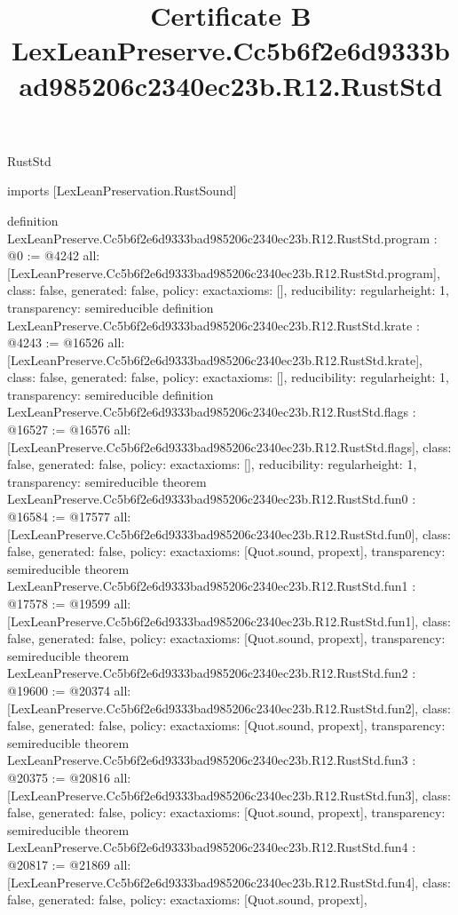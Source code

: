 \begin{lexlean}{RustStd}
\title{Certificate B LexLeanPreserve.Cc5b6f2e6d9333bad985206c2340ec23b.R12.RustStd}
\begin{coremodule}
imports [LexLeanPreservation.RustSound]

definition LexLeanPreserve.Cc5b6f2e6d9333bad985206c2340ec23b.R12.RustStd.program : @0 := @4242 {
  all: [LexLeanPreserve.Cc5b6f2e6d9333bad985206c2340ec23b.R12.RustStd.program],
  class: false,
  generated: false,
  policy: exact{axioms: []},
  reducibility: regular{height: 1},
  transparency: semireducible
}
definition LexLeanPreserve.Cc5b6f2e6d9333bad985206c2340ec23b.R12.RustStd.krate : @4243 := @16526 {
  all: [LexLeanPreserve.Cc5b6f2e6d9333bad985206c2340ec23b.R12.RustStd.krate],
  class: false,
  generated: false,
  policy: exact{axioms: []},
  reducibility: regular{height: 1},
  transparency: semireducible
}
definition LexLeanPreserve.Cc5b6f2e6d9333bad985206c2340ec23b.R12.RustStd.flags : @16527 := @16576 {
  all: [LexLeanPreserve.Cc5b6f2e6d9333bad985206c2340ec23b.R12.RustStd.flags],
  class: false,
  generated: false,
  policy: exact{axioms: []},
  reducibility: regular{height: 1},
  transparency: semireducible
}
theorem LexLeanPreserve.Cc5b6f2e6d9333bad985206c2340ec23b.R12.RustStd.fun0 : @16584 := @17577 {
  all: [LexLeanPreserve.Cc5b6f2e6d9333bad985206c2340ec23b.R12.RustStd.fun0],
  class: false,
  generated: false,
  policy: exact{axioms: [Quot.sound, propext]},
  transparency: semireducible
}
theorem LexLeanPreserve.Cc5b6f2e6d9333bad985206c2340ec23b.R12.RustStd.fun1 : @17578 := @19599 {
  all: [LexLeanPreserve.Cc5b6f2e6d9333bad985206c2340ec23b.R12.RustStd.fun1],
  class: false,
  generated: false,
  policy: exact{axioms: [Quot.sound, propext]},
  transparency: semireducible
}
theorem LexLeanPreserve.Cc5b6f2e6d9333bad985206c2340ec23b.R12.RustStd.fun2 : @19600 := @20374 {
  all: [LexLeanPreserve.Cc5b6f2e6d9333bad985206c2340ec23b.R12.RustStd.fun2],
  class: false,
  generated: false,
  policy: exact{axioms: [Quot.sound, propext]},
  transparency: semireducible
}
theorem LexLeanPreserve.Cc5b6f2e6d9333bad985206c2340ec23b.R12.RustStd.fun3 : @20375 := @20816 {
  all: [LexLeanPreserve.Cc5b6f2e6d9333bad985206c2340ec23b.R12.RustStd.fun3],
  class: false,
  generated: false,
  policy: exact{axioms: [Quot.sound, propext]},
  transparency: semireducible
}
theorem LexLeanPreserve.Cc5b6f2e6d9333bad985206c2340ec23b.R12.RustStd.fun4 : @20817 := @21869 {
  all: [LexLeanPreserve.Cc5b6f2e6d9333bad985206c2340ec23b.R12.RustStd.fun4],
  class: false,
  generated: false,
  policy: exact{axioms: [Quot.sound, propext]},
}
\end{coremodule}
\end{lexlean}
